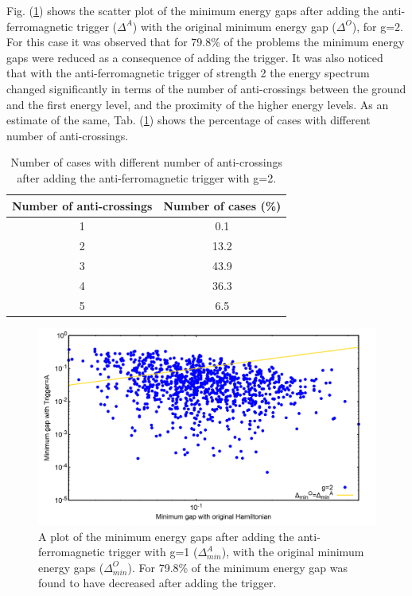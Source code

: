 \documentclass[../main.tex]{subfiles}
\begin{document}
Fig. (\ref{fig:a39}) shows the scatter plot of the minimum energy gaps after adding the anti-ferromagnetic trigger ($\Delta^A$) with the original minimum energy gap ($\Delta^O$), for g=2. For this case it was observed that for 79.8\% of the problems the minimum energy gaps were reduced as a consequence of adding the trigger. It was also noticed that with the anti-ferromagnetic trigger of strength 2 the energy spectrum changed significantly in terms of the number of anti-crossings between the ground and the first energy level, and the proximity of the higher energy levels. As an estimate of the same, Tab. (\ref{tab:a5}) shows the percentage of cases with different number of anti-crossings.
\begin{table}[H]
\centering
\renewcommand{\arraystretch}{1.5}
\begin{tabular}{|c|c|}
\hline 
Number of anti-crossings & Number of cases (\%) \\ 
\hline 
1 & 0.1 \\ 
\hline 
2 & 13.2 \\ 
\hline 
3 & 43.9 \\ 
\hline 
4 & 36.3 \\ 
\hline 
5 & 6.5 \\
\hline
\end{tabular} 
\caption{Number of cases with different number of anti-crossings after adding the anti-ferromagnetic trigger with g=2.}
\label{tab:a5}

\end{table}
\begin{figure}[H]
\centering 
\includegraphics[scale=0.2]{MinGap_A_g2.png}
\caption{A plot of the minimum energy gaps after adding the anti-ferromagnetic trigger with g=1 ($\Delta_{min}^A$), with the original minimum energy gaps ($\Delta_{min}^O$). For 79.8\% of the minimum energy gap was found to have decreased after adding the trigger.}
\label{fig:a39}
\end{figure}
\end{document}
